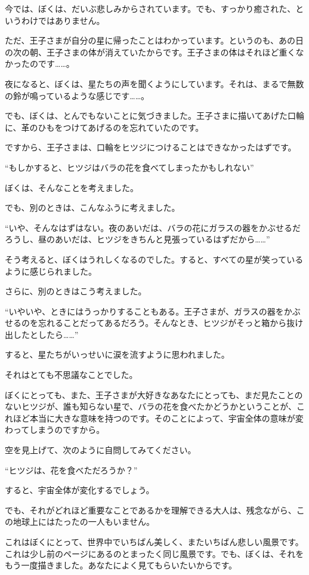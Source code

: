 今では、ぼくは、だいぶ悲しみからされています。でも、すっかり癒された、というわけではありません。

ただ、王子さまが自分の星に帰ったことはわかっています。というのも、あの日の次の朝、王子さまの体が消えていたからです。王子さまの体はそれほど重くなかったのです……。

夜になると、ぼくは、星たちの声を聞くようにしています。それは、まるで無数の鈴が鳴っているような感じです……。

でも、ぼくは、とんでもないことに気づきました。王子さまに描いてあげた口輪に、革のひもをつけてあげるのを忘れていたのです。

ですから、王子さまは、口輪をヒツジにつけることはできなかったはずです。

“もしかすると、ヒツジはバラの花を食べてしまったかもしれない”

ぼくは、そんなことを考えました。

でも、別のときは、こんなふうに考えました。

“いや、そんなはずはない。夜のあいだは、バラの花にガラスの器をかぶせるだろうし、昼のあいだは、ヒツジをきちんと見張っているはずだから……”

そう考えると、ぼくはうれしくなるのでした。すると、すべての星が笑っているように感じられました。

さらに、別のときはこう考えました。

“いやいや、ときにはうっかりすることもある。王子さまが、ガラスの器をかぶせるのを忘れることだってあるだろう。そんなとき、ヒツジがそっと箱から抜け出したとしたら……”

すると、星たちがいっせいに涙を流すように思われました。

それはとても不思議なことでした。

ぼくにとっても、また、王子さまが大好きなあなたにとっても、まだ見たことのないヒツジが、誰も知らない星で、バラの花を食べたかどうかということが、これほど本当に大きな意味を持つのです。そのことによって、宇宙全体の意味が変わってしまうのですから。

空を見上げて、次のように自問してみてください。

“ヒツジは、花を食べただろうか？”

すると、宇宙全体が変化するでしょう。

でも、それがどれほど重要なことであるかを理解できる大人は、残念ながら、この地球上にはたったの一人もいません。


これはぼくにとって、世界中でいちばん美しく、またいちばん悲しい風景です。これは少し前のページにあるのとまったく同じ風景です。でも、ぼくは、それをもう一度描きました。あなたによく見てもらいたいからです。


